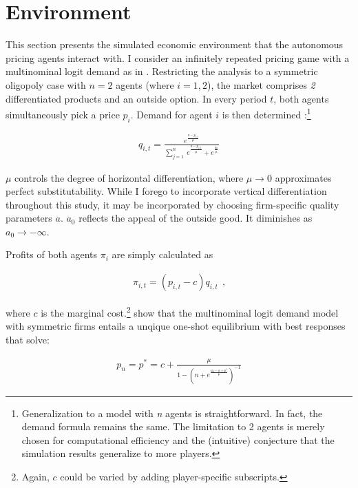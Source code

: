 \section{Environment}\label{enironment}

This section presents the simulated economic environment that the autonomous pricing agents interact with. I consider an infinitely repeated pricing game with a multinominal logit demand as in \textcite{calvano_artificial_2019}. Restricting the analysis to a symmetric oligopoly case with $n=2$ agents (where $i = 1,2$), the market comprises \emph{2} differentiated products and an outside option. In every period $t$, both agents simultaneously pick a price $p_i$. Demand for agent $i$ is then determined \parencite{anderson_logit_1992}:\footnote{Generalization to a model with \emph{n} agents is straightforward. In fact, the demand formula remains the same. The limitation to 2 agents is merely chosen for computational efficiency and the (intuitive) conjecture that the simulation results generalize to more players.}

\begin{gather}\label{quantity}
q_{i,t}=\frac{e^{\frac{a - p_{i,t}}{\mu}}}{\sum_{j=1}^{n}~ e^{\frac{a-p_{j,t}}{\mu}}+e^{\frac{a_0}{\mu}}}
\end{gather}

$\mu$ controls the degree of horizontal differentiation, where $\mu \rightarrow 0$ approximates perfect substitutability. While I forego to incorporate vertical differentiation throughout this study, it may be incorporated by choosing firm-specific quality parameters $a$. $a_0$ reflects the appeal of the outside good. It diminishes as $a_0 \rightarrow -\infty$. 

Profits of both agents $\pi_i$ are simply calculated as

\begin{gather}\label{profit}
\pi_{i,t} = (p_{i,t} - c) q_{i,t} ~~ \text{,}
\end{gather}

where $c$ is the marginal cost.\footnote{Again, $c$ could be varied by adding player-specific subscripts.} \textcite{anderson_logit_1992} show that the multinominal logit demand model with symmetric firms entails a unqique one-shot equilibrium with best responses that solve:

\begin{gather}\label{best_response}
	p_n = p^* = c + \frac{\mu}{1 - (n + e^{\frac{a_0 - a + p^*}{\mu}})^{-1}}
\end{gather}

